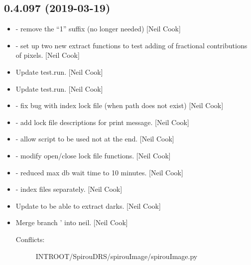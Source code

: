 \documentclass[a4paper,10pt,english]{report}
\begin{document}
\subsection{0.4.097 (2019-03-19)}
\label{\detokenize{misc/changelog:id162}}\begin{itemize}
\item {} 
 - remove the “1” suffix (no longer needed) {[}Neil
Cook{]}

\item {} 
 - set up two new extract functions to test adding of
fractional contributions of pixels. {[}Neil Cook{]}

\item {} 
Update test.run. {[}Neil Cook{]}

\item {} 
Update test.run. {[}Neil Cook{]}

\item {} 
 - fix bug with index lock file (when path does not
exist) {[}Neil Cook{]}

\item {} 
 - add lock file descriptions for print message. {[}Neil
Cook{]}

\item {} 
 - allow  script to be used not at the end.
{[}Neil Cook{]}

\item {} 
 - modify open/close lock file functions. {[}Neil Cook{]}

\item {} 
 - reduced max db wait time to 10 minutes.
{[}Neil Cook{]}

\item {} 
 - index files separately. {[}Neil Cook{]}

\item {} 
Update  to be able to extract darks. {[}Neil Cook{]}

\item {} 
Merge branch ’ into neil. {[}Neil Cook{]}
\begin{description}
\item[{Conflicts:}] \leavevmode
INTROOT/SpirouDRS/spirouImage/spirouImage.py


\end{description}
\end{itemize}
\end{document}
